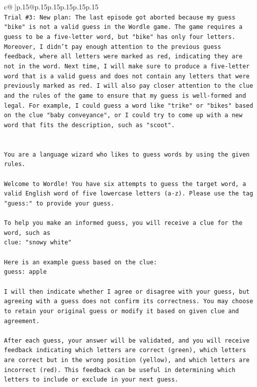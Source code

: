 \documentclass{article}
\begin{document}
{\begin{supertabular}{c@{$\;$}|p{.15\linewidth}@{}p{.15\linewidth}p{.15\linewidth}p{.15\linewidth}p{.15\linewidth}p{.15\linewidth}}
{{{\\ 
\texttt{Trial \#3: New plan: The last episode got aborted because my guess "bike" is not a valid guess in the Wordle game. The game requires a guess to be a five{-}letter word, but "bike" has only four letters. Moreover, I didn't pay enough attention to the previous guess feedback, where all letters were marked as red, indicating they are not in the word. Next time, I will make sure to produce a five{-}letter word that is a valid guess and does not contain any letters that were previously marked as red. I will also pay closer attention to the clue and the rules of the game to ensure that my guess is well{-}formed and legal. For example, I could guess a word like "trike" or "bikes" based on the clue "baby conveyance", or I could try to come up with a new word that fits the description, such as "scoot".} \\
\\ 
\\ 
\texttt{You are a language wizard who likes to guess words by using the given rules.} \\
\\ 
\texttt{Welcome to Wordle! You have six attempts to guess the target word, a valid English word of five lowercase letters (a{-}z). Please use the tag "guess:" to provide your guess.} \\
\\ 
\texttt{To help you make an informed guess, you will receive a clue for the word, such as} \\
\texttt{clue: "snowy white"} \\
\\ 
\texttt{Here is an example guess based on the clue: } \\
\texttt{guess: apple} \\
\\ 
\texttt{I will then indicate whether I agree or disagree with your guess, but agreeing with a guess does not confirm its correctness. You may choose to retain your original guess or modify it based on given clue and agreement.} \\
\\ 
\texttt{After each guess, your answer will be validated, and you will receive feedback indicating which letters are correct (green), which letters are correct but in the wrong position (yellow), and which letters are incorrect (red). This feedback can be useful in determining which letters to include or exclude in your next guess.} \\
\\ 
}}}
\end{supertabular}}
\end{document}
